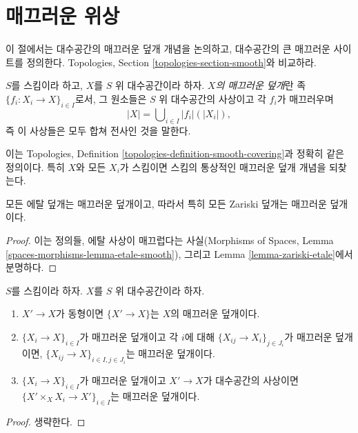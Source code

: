 \section{매끄러운 위상}
\label{section-smooth}

\noindent
이 절에서는 대수공간의 매끄러운 덮개 개념을 논의하고, 대수공간의 큰
매끄러운 사이트를 정의한다. Topologies, Section
\ref{topologies-section-smooth}와 비교하라.

\begin{definition}
\label{definition-smooth-covering}
$S$를 스킴이라 하고, $X$를 $S$ 위 대수공간이라 하자. {\it $X$의
매끄러운 덮개}란 족 $\{f_i : X_i \to X\}_{i \in I}$로서, 그 원소들은
$S$ 위 대수공간의 사상이고 각 $f_i$가 매끄러우며
$$
|X| = \bigcup\nolimits_{i \in I} |f_i|(|X_i|),
$$
즉 이 사상들은 모두 합쳐 전사인 것을 말한다.
\end{definition}

\noindent
이는 Topologies, Definition \ref{topologies-definition-smooth-covering}과
정확히 같은 정의이다. 특히 $X$와 모든 $X_i$가 스킴이면 스킴의 통상적인
매끄러운 덮개 개념을 되찾는다.

\begin{lemma}
\label{lemma-zariski-etale-smooth}
모든 에탈 덮개는 매끄러운 덮개이고, 따라서 특히 모든 Zariski 덮개는
매끄러운 덮개이다.
\end{lemma}

\begin{proof}
이는 정의들, 에탈 사상이 매끄럽다는 사실(Morphisms of Spaces, Lemma
\ref{spaces-morphisms-lemma-etale-smooth}), 그리고 Lemma
\ref{lemma-zariski-etale}에서 분명하다.
\end{proof}

\begin{lemma}
\label{lemma-smooth}
$S$를 스킴이라 하자. $X$를 $S$ 위 대수공간이라 하자.
\begin{enumerate}
\item $X' \to X$가 동형이면 $\{X' \to X\}$는 $X$의 매끄러운 덮개이다.
\item $\{X_i \to X\}_{i\in I}$가 매끄러운 덮개이고 각 $i$에 대해
$\{X_{ij} \to X_i\}_{j\in J_i}$가 매끄러운 덮개이면,
$\{X_{ij} \to X\}_{i \in I, j\in J_i}$는 매끄러운 덮개이다.
\item $\{X_i \to X\}_{i\in I}$가 매끄러운 덮개이고 $X' \to X$가
대수공간의 사상이면
$\{X' \times_X X_i \to X'\}_{i\in I}$는 매끄러운 덮개이다.
\end{enumerate}
\end{lemma}

\begin{proof}
생략한다.
\end{proof}

